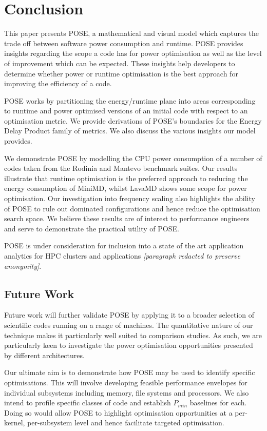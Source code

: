 \section{Conclusion}
\label{sec:conclusion}
\noindent
This paper presents POSE, a mathematical and visual model which captures the trade off between software power consumption and runtime.
POSE provides insights regarding the scope a code has for power optimisation as well as the level of improvement which can be expected.
These insights help developers to determine whether power or runtime optimisation is the best approach for improving the efficiency of a code.

POSE works by partitioning the energy/runtime plane into areas corresponding to runtime and power optimised versions of an initial code with respect to an optimisation metric.
We provide derivations of POSE's boundaries for the Energy Delay Product family of metrics.
We also discuss the various insights our model provides.

We demonstrate POSE by modelling the CPU power consumption of a number of codes taken from the Rodinia and Mantevo benchmark suites.  
Our results illustrate that runtime optimisation is the preferred approach to reducing the energy consumption of MiniMD, whilst LavaMD shows some scope for power optimisation.
Our investigation into frequency scaling also highlights the ability of POSE to rule out dominated configurations and hence reduce the optimisation search space.
We believe these results are of interest to performance engineers and serve to demonstrate the practical utility of POSE.

POSE is under consideration for inclusion into a state of the art application analytics for HPC clusters and applications \textit{[paragraph redacted to preserve anonymity]}.

\subsection*{Future Work}
\noindent
Future work will further validate POSE by applying it to a broader selection of scientific codes running on a range of machines.
The quantitative nature of our technique makes it particularly well suited to comparison studies.
As such, we are particularly keen to investigate the power optimisation opportunities presented by different architectures.

Our ultimate aim is to demonstrate how POSE may be used to identify specific optimisations.
This will involve developing feasible performance envelopes for individual subsystems including memory, file systems and processors. 
We also intend to profile specific classes of code and establish $P_{min}$ baselines for each.
Doing so would allow POSE to highlight optimisation opportunities at a per-kernel, per-subsystem level and hence facilitate targeted optimisation.
